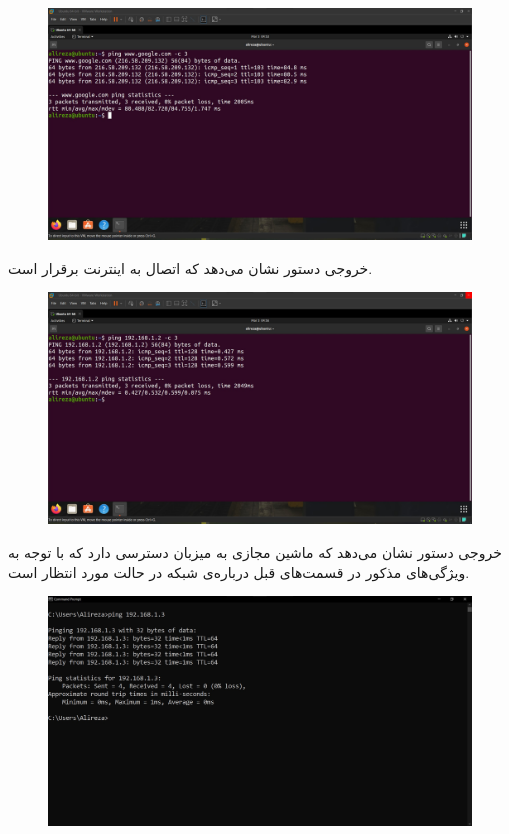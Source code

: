 \documentclass{article}
\begin{document}
\subsection{}
\begin{figure}[H]
    \centering
    \includegraphics[width=1.0\textwidth]{figures/3a.jpg}
    \caption
	{
	}
    \label{fig:fig1}
\end{figure}
خروجی دستور  نشان می‌دهد که اتصال به اینترنت برقرار است.
\begin{figure}[H]
    \centering
    \includegraphics[width=1.0\textwidth]{figures/3b.jpg}
    \caption
	{
	}
    \label{fig:fig1}
\end{figure}
خروجی دستور  نشان می‌دهد که ماشین مجازی به میزبان دسترسی دارد که با توجه به ویژگی‌های مذکور در قسمت‌های قبل درباره‌ی شبکه در حالت  مورد انتظار است.
\begin{figure}[H]
    \centering
    \includegraphics[width=1.0\textwidth]{figures/3c.jpg}
    \caption
	{
	}
    \label{fig:fig1}
\end{figure}
\end{document}
